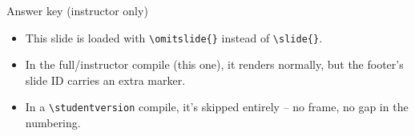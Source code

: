 %
%

\begin{standardframe}{Answer key (instructor only)}
	\begin{itemize}
		\item This slide is loaded with \texttt{\textbackslash omitslide\{\}} instead of \texttt{\textbackslash slide\{\}}.
		\item In the full/instructor compile (this one), it renders normally, but the footer's slide ID carries an extra marker.
		\item In a \texttt{\textbackslash studentversion} compile, it's skipped entirely -- no frame, no gap in the numbering.
	\end{itemize}
\end{standardframe}
